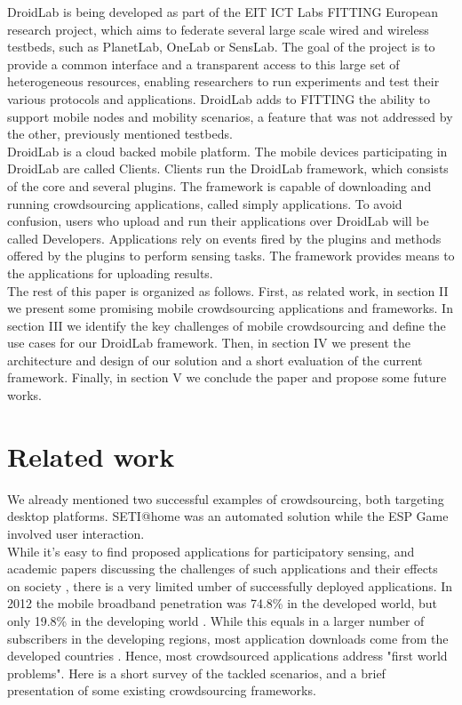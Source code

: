 \documentclass[conference,letterpaper]{IEEEtran}
\begin{document}
DroidLab is being developed as part of the EIT ICT Labs FITTING European research project, which aims to federate several large scale wired and wireless testbeds, such as PlanetLab, OneLab or SensLab. The goal of the project is to provide a common interface and a transparent access to this large set of heterogeneous resources, enabling researchers to run experiments and test their various protocols and applications. DroidLab adds to FITTING the ability to support mobile nodes and mobility scenarios, a feature that was not addressed by the other, previously mentioned testbeds.\\
\indent DroidLab is a cloud backed mobile platform. The mobile devices participating in DroidLab are called Clients. Clients run the DroidLab framework, which consists of the core and several plugins. The framework is capable of downloading and running crowdsourcing applications, called simply applications. To avoid confusion, users who upload and run their applications over DroidLab will be called Developers. Applications rely on events fired by the plugins and methods offered by the plugins to perform sensing tasks. The framework provides means to the applications for uploading results.\\
\indent The rest of this paper is organized as follows. First, as related work, in section II we present some  promising mobile crowdsourcing applications and frameworks. In section III we  identify the key challenges of mobile crowdsourcing and define the use cases for our DroidLab framework. Then, in section IV we present the architecture and design of our solution and  a short evaluation of the current framework. Finally, in section V we conclude the paper and propose some future works.
\section{Related work}
\label{sec:related_work}
We already mentioned two successful examples of crowdsourcing, both targeting desktop platforms. SETI@home was an automated solution while the ESP Game involved user interaction.\\
\indent While it's easy to find proposed applications for participatory sensing, and academic papers discussing the challenges of such applications and their effects on society \cite{Estrin2010}, there is a very limited umber of successfully deployed applications. In 2012 the mobile broadband penetration was  74.8\% in the developed world, but only 19.8\% in the developing world \cite{MobileStats}. While this equals in a larger number of subscribers in the developing regions, most application downloads come from the developed countries \cite{AppDownloads}. Hence, most crowdsourced applications address "first world problems". Here is a short survey of the tackled scenarios, and a brief presentation of some existing crowdsourcing frameworks.
\end{document}
